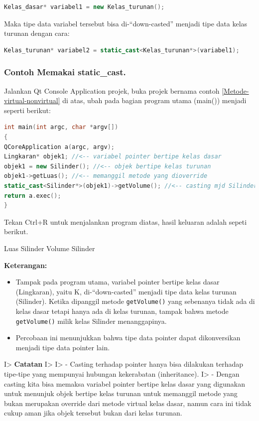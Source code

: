 \begin{lstlisting}[language=c++, numbers=none]
Kelas_dasar* variabel1 = new Kelas_turunan();
\end{lstlisting}

Maka tipe data variabel tersebut bisa di-``down-casted'' menjadi tipe
data kelas turunan dengan cara:

\begin{lstlisting}[language=c++, numbers=none]
Kelas_turunan* variabel2 = static_cast<Kelas_turunan*>(variabel1);
\end{lstlisting}

\subsubsection*{Contoh  Memakai static\_cast.}

Jalankan Qt Console Application projek, buka projek bernama contoh \ref{Metode-virtual-nonvirtual} di
atas, ubah pada bagian program utama (main()) menjadi seperti berikut:

\begin{lstlisting}[language=c++, caption=Memakai static\_cast]
int main(int argc, char *argv[])
{
QCoreApplication a(argc, argv);
Lingkaran* objek1; //<-- variabel pointer bertipe kelas dasar
objek1 = new Silinder(); //<-- objek bertipe kelas turunan
objek1->getLuas(); //<-- memanggil metode yang dioverride
static_cast<Silinder*>(objek1)->getVolume(); //<-- casting mjd Silinder
return a.exec();
}
\end{lstlisting}

Tekan Ctrl+R untuk menjalankan program diatas, hasil keluaran adalah
sepeti berikut.

\begin{lcverbatim}
Luas Silinder
Volume Silinder
\end{lcverbatim}

\textbf{Keterangan:}

\begin{itemize}
\tightlist
\item
  Tampak pada program utama, variabel pointer bertipe kelas dasar
  (Lingkaran), yaitu K, di-``down-casted'' menjadi tipe data kelas
  turunan (Silinder). Ketika dipanggil metode \texttt{getVolume()} yang
  sebenanya tidak ada di kelas dasar tetapi hanya ada di kelas turunan,
  tampak bahwa metode \texttt{getVolume()} milik kelas Silinder
  menanggapinya.
\item
  Percobaan ini menunjukkan bahwa tipe data pointer dapat dikonversikan
  menjadi tipe data pointer lain.
\end{itemize}

I\textgreater{} \textbf{Catatan} I\textgreater{} I\textgreater{} -
Casting terhadap pointer hanya bisa dilakukan terhadap tipe-tipe yang
mempunyai hubungan kekerabatan (inheritance). I\textgreater{} - Dengan
casting kita bisa memaksa variabel pointer bertipe kelas dasar yang
digunakan untuk menunjuk objek bertipe kelas turunan untuk memanggil
metode yang bukan merupakan override dari metode virtual kelas dasar,
namun cara ini tidak cukup aman jika objek tersebut bukan dari kelas
turunan.
